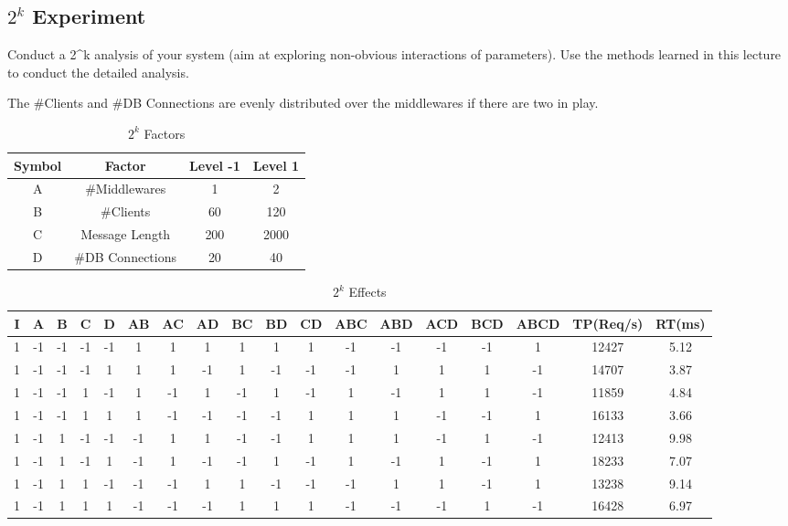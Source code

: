 \documentclass[11pt]{article}
\begin{document}
\subsection{$2^k$ Experiment}\label{sec:k-experiment}

Conduct a 2\^{}k analysis of your system (aim at exploring non-obvious
interactions of parameters). Use the methods learned in this lecture to
conduct the detailed analysis.

The \#Clients and \#DB Connections are evenly distributed over the middlewares if there are two in play.
\begin{landscape}
\begin{table}
\small
\centering
\caption{$2^k$ Factors}
\label{tbl:2k_labels}
\begin{tabular}{cccc}
	Symbol & Factor & Level -1 & Level 1 \\ \hline
	A & \#Middlewares & 1 & 2 \\
	B & \#Clients & 60 & 120 \\
	C & Message Length & 200 & 2000 \\
	D & \#DB Connections & 20 & 40 \\ \hline
\end{tabular}
\end{table}
\begin{table}[]
	\small
	\centering
	\caption{$2^k$ Effects}
	\label{tbl:2k}
	\begin{tabular}{|cccccccccccccccc|cc|}
		\hline
		I & A & B & C & D & AB & AC & AD & BC & BD & CD & ABC & ABD & ACD & BCD & ABCD & TP(Req/s) & RT(ms)\\ \hline
		1 & -1 & -1 & -1 & -1 & 1 & 1 & 1 & 1 & 1 & 1 & -1 & -1 & -1 & -1 & 1 & 12427 & 5.12\\
		1 & -1 & -1 & -1 & 1 & 1 & 1 & -1 & 1 & -1 & -1 & -1 & 1 & 1 & 1 & -1 & 14707 & 3.87 \\
		1 & -1 & -1 & 1 & -1 & 1 & -1 & 1 & -1 & 1 & -1 & 1 & -1 & 1 & 1 & -1 & 11859 & 4.84 \\
		1 & -1 & -1 & 1 & 1 & 1 & -1 & -1 & -1 & -1 & 1 & 1 & 1 & -1 & -1 & 1 & 16133 & 3.66 \\
		1 & -1 & 1 & -1 & -1 & -1 & 1 & 1 & -1 & -1 & 1 & 1 & 1 & -1 & 1 & -1 & 12413 & 9.98 \\
		1 & -1 & 1 & -1 & 1 & -1 & 1 & -1 & -1 & 1 & -1 & 1 & -1 & 1 & -1 & 1 & 18233 & 7.07 \\
		1 & -1 & 1 & 1 & -1 & -1 & -1 & 1 & 1 & -1 & -1 & -1 & 1 & 1 & -1 & 1 & 13238 & 9.14 \\
		1 & -1 & 1 & 1 & 1 & -1 & -1 & -1 & 1 & 1 & 1 & -1 & -1 & -1 & 1 & -1 & 16428 & 6.97 \\

\end{tabular}
\end{table}
\end{landscape}
\end{document}
